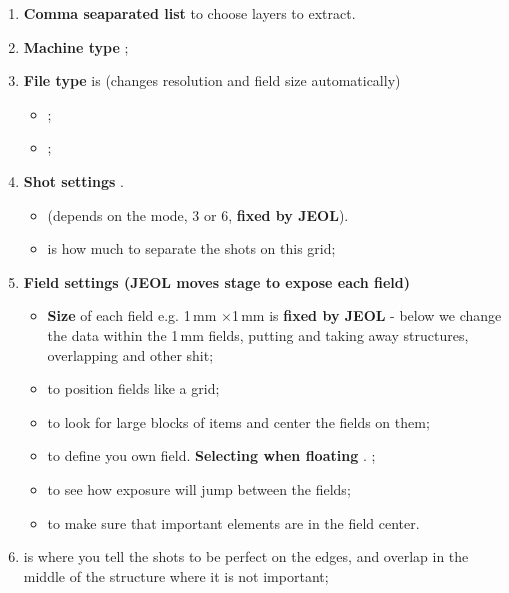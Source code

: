 \begin{enumerate}
\item \textbf{Comma seaparated list} to choose layers to extract.
\item \textbf{Machine type} ;
\item \textbf{File type} is   (changes resolution and field
  size automatically)
  \begin{itemize}
  \item  {} \hfill  {};
  \item  {} \hfill  {};
  \end{itemize}
\item \textbf{Shot settings}  \hfill {}.
  \begin{itemize}
  \item {} (depends on the mode, 3 or 6,
    \textbf{fixed by JEOL}). 
  \item  {}  is how  much to  separate the
    shots on this grid;
  \end{itemize}
\item \textbf{Field settings (JEOL moves stage to expose each field)}
  \begin{itemize}
  \item  \textbf{Size}  of each  field  e.g.   1\,mm  $ \times  $1\,mm  is
    \textbf{fixed  by JEOL}  - below  we change  the data  within the
    1\,mm fields, putting and taking away structures, overlapping and
    other shit;
  \item {} to position fields like a grid;
  \item  {}  to  look for  large
    blocks of items and center the fields on them;
  \item {} to define you
    own field.   \textbf{Selecting when floating}  .  ;
  \item {} to see how exposure will jump between
    the fields;
  \item {} to make sure that important elements
    are in the field center.
  \end{itemize}
\item {} is where  you tell the shots  to be
  perfect on  the edges, and overlap  in the middle of  the structure
  where it is not important;


\end{enumerate}
